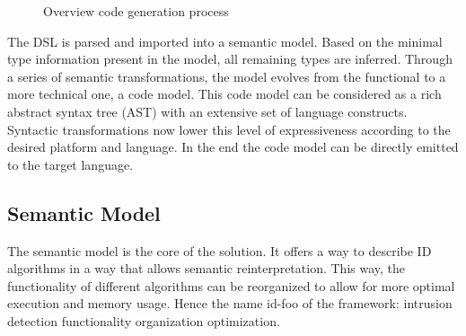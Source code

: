 \documentclass[conference]{IEEEtran}
\newcommand{\NAME}{id-foo\xspace}
\begin{document}
\begin{figure}[ht]
  \centering
\caption{Overview code generation process}
\label{fig:code-generation}
\end{figure}

The DSL is parsed and imported into a semantic model. Based on the minimal type
information present in the model, all remaining types are inferred. Through a
series of semantic transformations, the model evolves from the functional to a
more technical one, a code model. This code model can be considered as a rich
abstract syntax tree (AST) with an extensive set of language constructs.
Syntactic transformations now lower this level of expressiveness according to
the desired platform and language. In the end the code model can be directly
emitted to the target language.

\subsection{Semantic Model}

The semantic model is the core of the solution. It offers a way to describe ID
algorithms in a way that allows semantic reinterpretation. This way, the
functionality of different algorithms can be reorganized to allow for more
optimal execution and memory usage. Hence the name \NAME of the framework:
intrusion detection functionality organization optimization.
\end{document}
